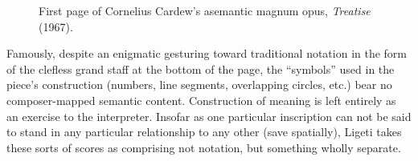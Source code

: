             \begin{figure} 
                \centering
                \captionsetup{width=.5\textwidth}
                \caption[First page of Cornelius Cardew's asemantic magnum opus, \textit{Treatise}(1967).]{First page of Cornelius Cardew's asemantic magnum opus, \textit{Treatise} (1967).\footnotemark}
                \label{fig:Treatise1}
            \end{figure}

    Famously, despite an enigmatic gesturing toward traditional notation in the form of the clefless grand staff at the bottom of the page, the ``symbols'' used in the piece's construction (numbers, line segments, overlapping circles, etc.) bear no composer-mapped semantic content. Construction of meaning is left entirely as an exercise to the interpreter. Insofar as one particular inscription can not be said to stand in any particular relationship to any other (save spatially), Ligeti takes these sorts of scores as comprising not notation, but something wholly separate.

